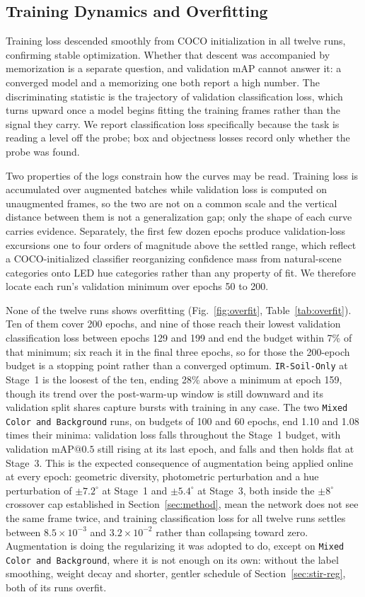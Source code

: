 ﻿\documentclass[journal]{IEEEtran}
\begin{document}
\subsection{Training Dynamics and Overfitting}
\label{sec:dynamics}
Training loss descended smoothly from COCO initialization in all twelve runs, confirming stable optimization. Whether that descent was accompanied by memorization is a separate question, and validation mAP cannot answer it: a converged model and a memorizing one both report a high number. The discriminating statistic is the trajectory of validation classification loss, which turns upward once a model begins fitting the training frames rather than the signal they carry. We report classification loss specifically because the task is reading a level off the probe; box and objectness losses record only whether the probe was found.

Two properties of the logs constrain how the curves may be read. Training loss is accumulated over augmented batches while validation loss is computed on unaugmented frames, so the two are not on a common scale and the vertical distance between them is not a generalization gap; only the shape of each curve carries evidence. Separately, the first few dozen epochs produce validation-loss excursions one to four orders of magnitude above the settled range, which reflect a COCO-initialized classifier reorganizing confidence mass from natural-scene categories onto LED hue categories rather than any property of fit. We therefore locate each run's validation minimum over epochs 50 to 200.

None of the twelve runs shows overfitting (Fig.~\ref{fig:overfit}, Table~\ref{tab:overfit}). Ten of them cover 200 epochs, and nine of those reach their lowest validation classification loss between epochs 129 and 199 and end the budget within 7\% of that minimum; six reach it in the final three epochs, so for those the 200-epoch budget is a stopping point rather than a converged optimum. \texttt{IR-Soil-Only} at Stage~1 is the loosest of the ten, ending 28\% above a minimum at epoch 159, though its trend over the post-warm-up window is still downward and its validation split shares capture bursts with training in any case. The two \texttt{Mixed Color and Background} runs, on budgets of 100 and 60 epochs, end 1.10 and 1.08 times their minima: validation loss falls throughout the Stage~1 budget, with validation $\text{mAP@0.5}$ still rising at its last epoch, and falls and then holds flat at Stage~3. This is the expected consequence of augmentation being applied online at every epoch: geometric diversity, photometric perturbation and a hue perturbation of $\pm 7.2^{\circ}$ at Stage~1 and $\pm 5.4^{\circ}$ at Stage~3, both inside the $\pm 8^{\circ}$ crossover cap established in Section~\ref{sec:method}, mean the network does not see the same frame twice, and training classification loss for all twelve runs settles between $8.5 \times 10^{-3}$ and $3.2 \times 10^{-2}$ rather than collapsing toward zero. Augmentation is doing the regularizing it was adopted to do, except on \texttt{Mixed Color and Background}, where it is not enough on its own: without the label smoothing, weight decay and shorter, gentler schedule of Section~\ref{sec:stir-reg}, both of its runs overfit.
\end{document}
